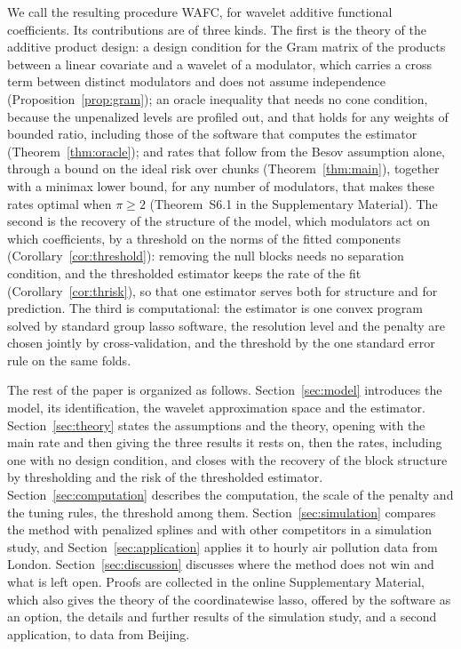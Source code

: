 We call the resulting procedure WAFC, for wavelet additive functional
coefficients. Its contributions are of   three kinds. The first is the theory of
the additive product design: a design condition for the Gram matrix of the
products between a linear covariate and a wavelet of a modulator, which
carries a cross term between distinct modulators and does not assume
independence (Proposition~\ref{prop:gram}); an oracle inequality that needs no
cone condition, because the unpenalized levels are profiled out, and
that holds for any weights of bounded ratio, including those of the software
that computes the estimator
(Theorem~\ref{thm:oracle}); and rates 
that follow from the Besov assumption alone, through a bound on the
ideal risk over chunks
(Theorem~\ref{thm:main}), together with a minimax lower bound, for any number
of modulators, that makes these rates optimal when $\pi \ge 2$ (Theorem~S6.1 in
the Supplementary Material). 
The second is the recovery of the structure of the model, which
modulators act on which coefficients, by a threshold on the norms of the
fitted components (Corollary~\ref{cor:threshold}): removing the null blocks
needs no separation condition, and the thresholded estimator keeps the rate of
the fit (Corollary~\ref{cor:thrisk}), so that one estimator serves both for
structure and for prediction. The third is computational: the
estimator is one convex program  solved by
standard group lasso software,  the resolution
level and the penalty are chosen jointly by cross-validation, and the
threshold by the one standard error rule on the same folds.


The rest of the paper is organized as follows. Section~\ref{sec:model}
introduces the model, its identification, the wavelet approximation space and the estimator.
Section~\ref{sec:theory} states the assumptions and the theory, opening with
the main rate and then giving the three results it rests on, then
the rates, including one with no design condition, and
closes with the recovery of the block structure by thresholding and
the risk of the thresholded estimator.
Section~\ref{sec:computation} describes the computation, the scale of the
penalty and the tuning rules, the threshold among them.
Section~\ref{sec:simulation} compares the method with penalized
splines and with other competitors in a simulation study, and
Section~\ref{sec:application} applies it to hourly air pollution data from
London. Section~\ref{sec:discussion} discusses where the method
does not win and what is left open. Proofs are collected in the online Supplementary
Material, which also gives the theory of the coordinatewise lasso,
offered by the software as an option, the details and further
results of the simulation study, and a second application, to data from
Beijing.

